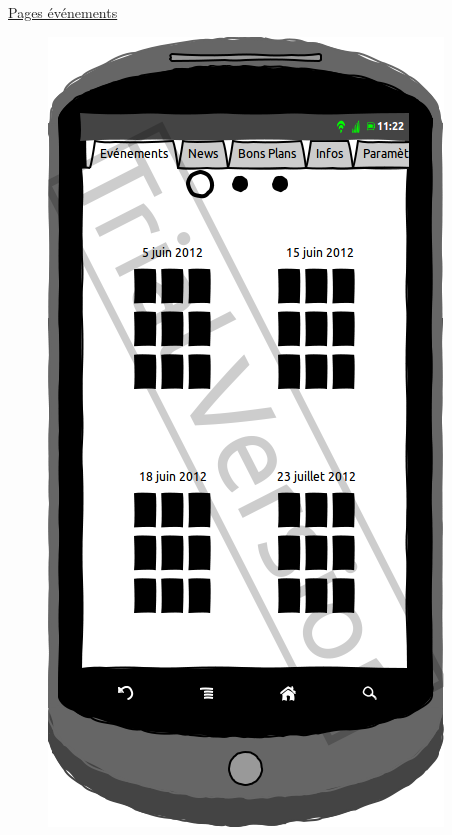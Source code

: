 \documentclass[a4paper, 11px]{article}
\begin{document}
\underline{Pages événements}
\vfill
\begin{figure}[htbp]
	\begin{minipage}[c]{.50\linewidth}
		\begin{center}
			\includegraphics[scale=0.3]{../../Sketch/Android/quatreEvent.png}
		\end{center}
	\end{minipage}
	\hfill
	\begin{minipage}[c]{.50\linewidth}
		\begin{center}

\end{center}
\end{minipage}
\end{figure}
\end{document}
